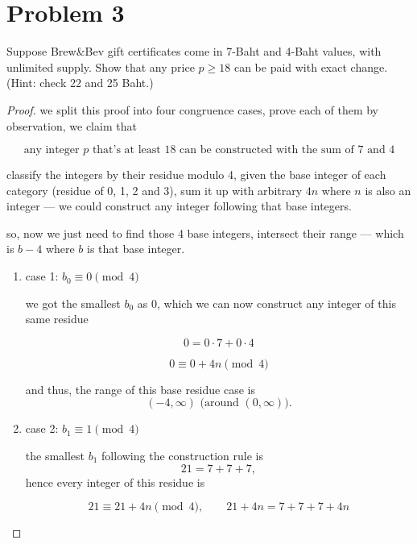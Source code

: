 \vspace{1em}
\hrulefill

\section*{Problem 3}
Suppose Brew\&Bev gift certificates come in 7-Baht and 4-Baht values, with unlimited supply. Show that any price $p \ge 18$ can be paid with exact change. (Hint: check 22 and 25 Baht.)

\medskip
\solution

\begin{proof}

we split this proof into four congruence cases, prove each of them by
observation, we claim that

\[
\text{any integer } p \text{ that's at least } 18 \text{ can be constructed
with the sum of } 7 \text{ and } 4
\]

classify the integers by their residue modulo 4, given the base integer
of each category (residue of 0, 1, 2 and 3), sum it up with arbitrary $4n$
where $n$ is also an integer --- we could construct any integer following
that base integers.

\vspace{1em}

so, now we just need to find those 4 base integers, intersect their range
--- which is $b - 4$ where $b$ is that base integer.

\begin{enumerate}
\item case 1: $b_0 \equiv 0 \pmod 4$

\vspace{1em}

we got the smallest $b_0$ as $0$, which we can now construct any integer of
this same residue

\[
0 = 0 \cdot 7 + 0 \cdot 4
\]

\[
0 \equiv 0 + 4n \pmod 4
\]

and thus, the range of this base residue case is
\[
(-4, \infty) \text{ (around } (0, \infty)).
\]

\item case 2: $b_1 \equiv 1 \pmod 4$

\vspace{1em}

the smallest $b_1$ following the construction rule is
\[
21 = 7 + 7 + 7,
\]
hence every integer of this residue is

\[
21 \equiv 21 + 4n \pmod 4, \qquad 21 + 4n = 7 + 7 + 7 + 4n
\]


\end{enumerate}
\end{proof}
